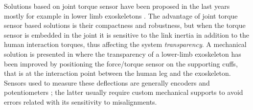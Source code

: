 %
%
\par Solutions based on joint torque sensor have been proposed in the last years mostly for example in  lower limb exoskeletons  \cite{kim2015design,aguirre2011design,hwang2015method}. 
The advantage of joint torque sensor based solutions is their compactness and robustness, but when the torque sensor is embedded in the joint it is sensitive to the link inertia in addition to the human interaction torques, thus affecting the system {\em transparency}. A mechanical solution is presented in \cite{zanotto2013improving} where the transparency of a lower-limb exoskeleton has been improved by positioning the force/torque sensor on the supporting cuffs, that is at the interaction point between the human leg and the exoskeleton.
 Sensors used to measure these deflections are generally encoders \cite{dos2017design} and potentiometers \cite{junior2016series}; the latter usually require custom mechanical supports to avoid errors related with its sensitivity to misalignments.
